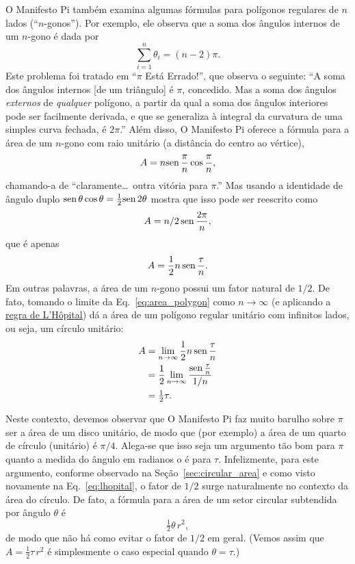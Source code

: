 O Manifesto Pi também examina algumas fórmulas para polígonos regulares de $n$ lados (``$n$-gonos''). Por exemplo, ele observa que a soma dos ângulos internos de um $n$-gono é dada por
\[
\sum_{i=1}^n \theta_i=(n-2)\pi.
\]
Este problema foi tratado em ``$\pi$ Está Errado!'', que observa o seguinte: ``A soma dos ângulos internos [de um triângulo] é $\pi$, concedido. Mas a soma dos ângulos \emph{externos} de \emph{qualquer} polígono, a partir da qual a soma dos ângulos interiores pode ser facilmente derivada, e que se generaliza à integral da curvatura de uma simples curva fechada, é $2\pi$.'' Além disso, O Manifesto Pi oferece a fórmula para a área de um $n$-gono com raio unitário (a distância do centro ao vértice),
\[ A=n\mbox{sen}\,\frac{\pi}{n}\cos\frac{\pi}{n}, \]
chamando-a de ``claramente\ldots\ outra vitória para $\pi$.'' Mas usando a identidade de ângulo duplo $\mbox{sen}\,\theta\cos\theta = \frac{1}{2} \mbox{sen}\,2\theta$ mostra que isso pode ser reescrito como
\[ A = n/2\, \mbox{sen}\,\frac{2\pi}{n}, \]
que é apenas
\begin{equation}
\label{eq:area_polygon}
A = \frac{1}{2} n\, \mbox{sen}\,\frac{\tau}{n}.
\end{equation}
Em outras palavras, a área de um $n$-gono possui um fator natural de $1/2$. De fato, tomando o limite da Eq.~\eqref{eq:area_polygon} como $n\rightarrow \infty$ (e aplicando a \href{https://mathworld.wolfram.com/LHospitalsRule.html}{regra de L'H\^{o}pital}) dá a área de um polígono regular unitário com infinitos lados, ou seja, um círculo unitário:
\begin{equation}
\label{eq:lhopital}
\begin{split}
A & = \lim_{n\rightarrow\infty} \frac{1}{2} n\, \mbox{sen}\,\frac{\tau}{n} \\
  & = \frac{1}{2} \lim_{n\rightarrow\infty} \frac{\mbox{sen}\,\frac{\tau}{n}}{1/n} \\
  & = \tfrac{1}{2}\tau.
\end{split}
\end{equation}

Neste contexto, devemos observar que O Manifesto Pi faz muito barulho sobre $\pi$ ser a área de um disco unitário, de modo que (por exemplo) a área de um quarto de círculo (unitário) é $\pi/4$. Alega-se que isso seja um argumento tão bom para $\pi$ quanto a medida do ângulo em radianos o é para $\tau$. Infelizmente, para este argumento, conforme observado na Seção~\ref{sec:circular_area} e como visto novamente na Eq.~\eqref{eq:lhopital}, o fator de $1/2$ surge naturalmente no contexto da área do círculo. De fato, a fórmula para a área de um setor circular subtendida por ângulo $\theta$ é
\[
\tfrac{1}{2}\theta\, r^2,
\]
de modo que não há como evitar o fator de $1/2$ em geral. (Vemos assim que $A = \frac{1}{2} \tau\, r^2$ é simplesmente o caso especial quando $\theta = \tau$.)

